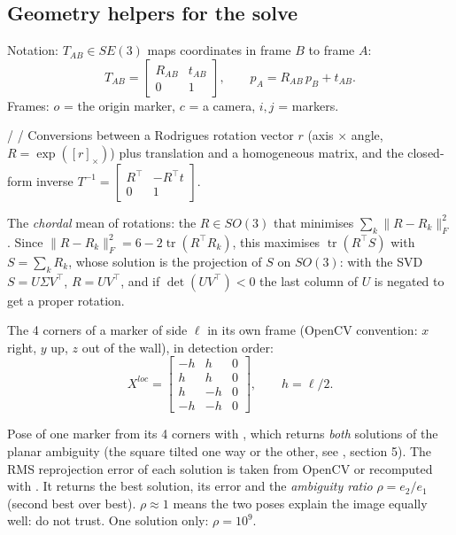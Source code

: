 \subsection{Geometry helpers for the solve}

Notation: $T_{AB} \in SE(3)$ maps coordinates in frame $B$ to frame $A$:
\[
T_{AB} = \begin{bmatrix} R_{AB} & t_{AB} \\ 0 & 1 \end{bmatrix}, \qquad p_A = R_{AB}\, p_B + t_{AB}.
\]
Frames: $o$ = the origin marker, $c$ = a camera, $i, j$ = markers.

 /  / 
Conversions between a Rodrigues rotation vector $r$ (axis $\times$ angle, $R = \exp([r]_\times)$) plus translation
and a homogeneous matrix, and the closed-form inverse
$T^{-1} = \left[\begin{smallmatrix} R^\top & -R^\top t \\ 0 & 1\end{smallmatrix}\right]$.

The \emph{chordal} mean of rotations: the $R \in SO(3)$ that minimises $\sum_k \lVert R - R_k \rVert_F^2$. Since
$\lVert R - R_k\rVert_F^2 = 6 - 2\operatorname{tr}(R^\top R_k)$, this maximises $\operatorname{tr}(R^\top S)$ with
$S = \sum_k R_k$, whose solution is the projection of $S$ on $SO(3)$: with the SVD $S = U\Sigma V^\top$,
$R = UV^\top$, and if $\det(UV^\top) < 0$ the last column of $U$ is negated to get a proper rotation.

The 4 corners of a marker of side $\ell$ in its own frame (OpenCV convention: $x$ right, $y$ up, $z$ out of the
wall), in detection order:
\[
X^{loc} = \begin{bmatrix} -h & h & 0 \\ h & h & 0 \\ h & -h & 0 \\ -h & -h & 0 \end{bmatrix}, \qquad h = \ell/2 .
\]

Pose of one marker from its 4 corners with , which returns
\emph{both} solutions of the planar ambiguity (the square tilted one way or the other, see
, section 5). The RMS reprojection error of each solution is
taken from OpenCV or recomputed with . It returns the best solution, its error and the
\emph{ambiguity ratio} $\rho = e_2 / e_1$ (second best over best). $\rho \approx 1$ means the two poses explain
the image equally well: do not trust. One solution only: $\rho = 10^9$.

